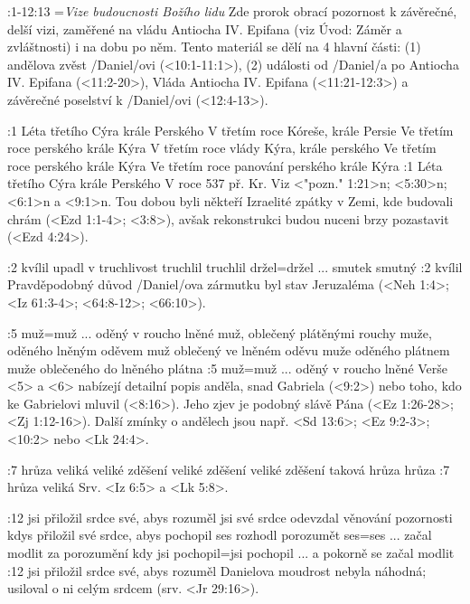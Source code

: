
:1-12:13 {}={\it Vize budoucnosti Božího lidu} Zde prorok obrací pozornost k  závěrečné, delší vizi, zaměřené na vládu Antiocha IV. Epifana (viz Úvod: Záměr a zvláštnosti) i na dobu po něm. Tento materiál se dělí na 4 hlavní části: (1) andělova zvěst \x/Daniel/ovi (<10:1-11:1>), (2) události od \x/Daniel/a po Antiocha IV. Epifana  (<11:2-20>), Vláda Antiocha IV. Epifana (<11:21-12:3>) a závěrečné poselství k \x/Daniel/ovi (<12:4-13>). 


:1  
    {Léta třetího Cýra krále Perského}   %
    {V třetím roce Kóreše, krále Persie}   %
    {Ve třetím roce perského krále Kýra}   %
    {V třetím roce vlády Kýra, krále perského}   %
    {Ve třetím roce perského krále Kýra}   %
    {Ve třetím roce panování perského krále Kýra}   %
:1 {Léta třetího Cýra krále Perského} V roce 537 př. Kr. Viz <"pozn." 1:21>n; <5:30>n; <6:1>n a <9:1>n. Tou dobou byli někteří Izraelité  zpátky v Zemi, kde budovali chrám (<Ezd 1:1-4>; <3:8>), avšak rekonstrukci budou nuceni brzy pozastavit (<Ezd 4:24>).

:2 {kvílil} {upadl v truchlivost} {truchlil} {truchlil} {držel}={držel ... smutek} {smutný}
:2 {kvílil} Pravděpodobný důvod \x/Daniel/ova zármutku byl stav Jeruzaléma (<Neh 1:4>; <Iz 61:3-4>; <64:8-12>; <66:10>).

:5 {muž}={muž ... oděný v roucho lněné} 
           {muž, oblečený plátěnými rouchy} 
           {muže, oděného lněným oděvem} 
           {muž oblečený ve lněném oděvu} 
           {muže oděného plátnem} 
           {muže oblečeného do lněného plátna}
:5 {muž}={muž ... oděný v roucho lněné} 
    Verše <5> a <6> nabízejí detailní popis anděla, snad Gabriela (<9:2>) nebo toho, kdo ke Gabrielovi mluvil (<8:16>). Jeho zjev je podobný slávě Pána (<Ez 1:26-28>; <Zj 1:12-16>). Další zmínky o andělech jsou např.  <Sd 13:6>; <Ez 9:2-3>; <10:2> nebo <Lk 24:4>.
    
:7
    {hrůza veliká}   %
    {veliké zděšení} %
    {veliké zděšení} %
    {veliké zděšení} %
    {taková hrůza}   %
    {hrůza}          %
:7 {hrůza veliká} Srv. <Iz 6:5> a <Lk 5:8>.

:12  
    {jsi přiložil srdce své, abys rozuměl}   %
    {jsi své srdce odevzdal věnování pozornosti}   %
    {kdys přiložil své srdce, abys pochopil}   %
    {ses rozhodl porozumět}   %
    {ses}={ses ... začal modlit za porozumění}   %
    {kdy jsi pochopil}={jsi pochopil ... a pokorně se začal modlit}   %
:12 {jsi přiložil srdce své, abys rozuměl} Danielova moudrost nebyla náhodná; usiloval o ni celým srdcem (srv. <Jr 29:16>). 


